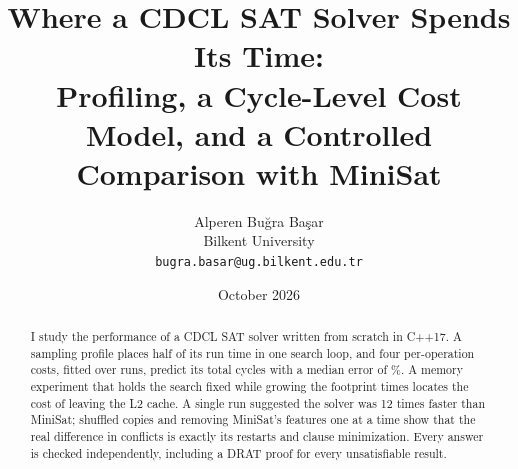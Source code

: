 \documentclass[11pt,a4paper]{article}
\title{Where a CDCL SAT Solver Spends Its Time:\\
       Profiling, a Cycle-Level Cost Model, and a Controlled Comparison with MiniSat}
\author{Alperen Buğra Başar \\ \small Bilkent University \\ \small \texttt{bugra.basar@ug.bilkent.edu.tr}}
\date{{October 2026}}
\begin{document}
\maketitle

\begin{abstract}
I study the performance of a CDCL SAT solver written from scratch in C++17. A
sampling profile places half of its run time in one search loop, and four
per-operation costs, fitted over \numModelRuns{} runs, predict its total cycles
with a median error of \numModelMedianErr\%. A memory experiment that holds the
search fixed while growing the footprint \numPadFootprint{} times locates the
cost of leaving the L2 cache. A single run suggested the solver was 12 times
faster than MiniSat; shuffled copies and removing MiniSat's features one at a
time show that the real difference in conflicts is exactly its restarts and
clause minimization. Every answer is checked independently, including a DRAT
proof for every unsatisfiable result.
\end{abstract}












\FloatBarrier   %




\appendix

\end{document}
